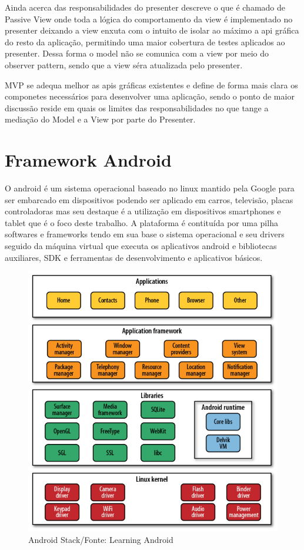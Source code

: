 Ainda acerca das responsabilidades do presenter  descreve
o que é chamado de Passive View onde toda a lógica do comportamento da view é
implementado no presenter deixando a view enxuta com o intuito de isolar ao
máximo a api gráfica do resto da aplicação, permitindo uma maior cobertura de
testes aplicados ao presenter. Dessa forma o model não se comunica com a view
por meio do observer pattern, sendo que a view séra atualizada pelo presenter.


MVP se adequa melhor as apis gráficas existentes e define de forma mais clara os
componetes necessários para desenvolver uma aplicação, sendo o ponto de maior
discussão reside em quais os limites das responsabilidades no que tange a
mediação do Model e a View por parte do Presenter.


\section{Framework Android}
 

O android é um sistema operacional baseado no linux mantido pela Google para
ser embarcado em dispositivos podendo ser aplicado em carros, televisão, placas
controladoras mas seu destaque é a utilização em dispositivos smartphones e
tablet que é o foco deste trabalho.
A plataforma é contituída por uma pilha softwares e frameworks tendo em sua base
o sistema operacional e seu drivers seguido da máquina virtual que executa os
aplicativos android e bibliotecas auxiliares, SDK e ferramentas de
desenvolvimento e aplicativos básicos.

\begin{figure}[h]
	\centering
	\includegraphics[scale=0.5]{img/android_stack.png}
	\caption{Android Stack/Fonte: Learning Android}
	\label{android_stack}
\end{figure}

